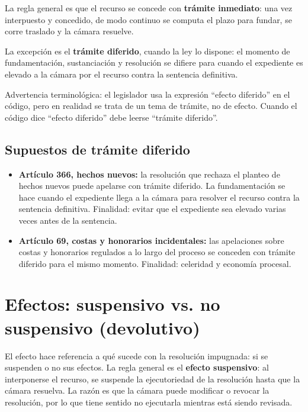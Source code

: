 \documentclass[12pt,oneside]{book}
\begin{document}
La regla general es que el recurso se concede con \textbf{tr\'amite inmediato}: una vez interpuesto y concedido, de modo continuo se computa el plazo para fundar, se corre traslado y la c\'amara resuelve.

La excepci\'on es el \textbf{tr\'amite diferido}, cuando la ley lo dispone: el momento de fundamentaci\'on, sustanciaci\'on y resoluci\'on se difiere para cuando el expediente es elevado a la c\'amara por el recurso contra la sentencia definitiva.

\begin{important}
Advertencia terminol\'ogica: el legislador usa la expresi\'on ``efecto diferido'' en el c\'odigo, pero en realidad se trata de un tema de tr\'amite, no de efecto. Cuando el c\'odigo dice ``efecto diferido'' debe leerse ``tr\'amite diferido''.
\end{important}

\subsection{Supuestos de tr\'amite diferido}

\begin{itemize}
    \item \textbf{Art\'iculo 366, hechos nuevos:} la resoluci\'on que rechaza el planteo de hechos nuevos puede apelarse con tr\'amite diferido. La fundamentaci\'on se hace cuando el expediente llega a la c\'amara para resolver el recurso contra la sentencia definitiva. Finalidad: evitar que el expediente sea elevado varias veces antes de la sentencia.
    \item \textbf{Art\'iculo 69, costas y honorarios incidentales:} las apelaciones sobre costas y honorarios regulados a lo largo del proceso se conceden con tr\'amite diferido para el mismo momento. Finalidad: celeridad y econom\'ia procesal.
\end{itemize}

\section{Efectos: suspensivo vs. no suspensivo (devolutivo)}

El efecto hace referencia a qu\'e sucede con la resoluci\'on impugnada: si se suspenden o no sus efectos. La regla general es el \textbf{efecto suspensivo}: al interponerse el recurso, se suspende la ejecutoriedad de la resoluci\'on hasta que la c\'amara resuelva. La raz\'on es que la c\'amara puede modificar o revocar la resoluci\'on, por lo que tiene sentido no ejecutarla mientras est\'a siendo revisada.
\end{document}
